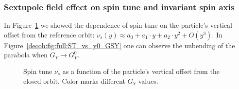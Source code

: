 \subsubsection{Sextupole field effect on spin tune and invariant spin axis}
In Figure~\ref{decoh:fig:ST_vs_y0_GSY} we showed the dependence of spin tune on the particle's
vertical offset from the reference orbit: $\nu_s(y) \approx a_0 + a_1\cdot y + a_2\cdot y^2 + O(y^3)$.
In Figure~\ref{decoh:fig:full:ST_vs_y0_GSY} one can observe the unbending of the parabola when
$G_Y \rightarrow G_Y^0$.
\begin{figure}[h!]
	\centering
	\caption{Spin tune $\nu_s$ as a function of the particle's vertical offset from the closed orbit.
          Color marks different $G_Y$ values.\label{decoh:fig:ST_vs_y0_GSY}}
\end{figure}

